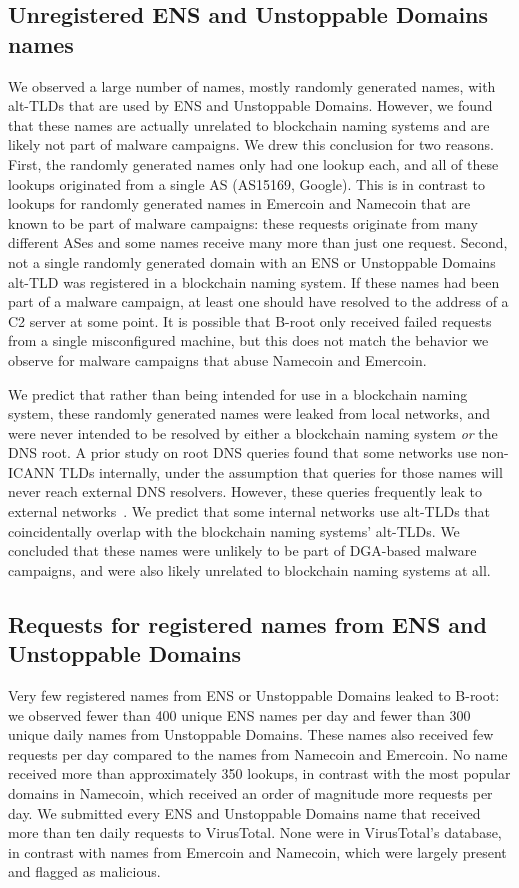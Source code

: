 \subsection{Unregistered ENS and Unstoppable Domains names}
 
We observed a large number of names, mostly randomly 
generated names, with alt-TLDs that are used 
by ENS and Unstoppable Domains. However, we found that these names are actually 
unrelated to blockchain naming systems and are likely not part of malware 
campaigns. We drew this conclusion for two reasons. First, the randomly 
generated names
only had one lookup each, and all of these lookups originated from a single AS 
(AS15169, Google). This is in contrast to lookups for 
randomly generated names in Emercoin and 
Namecoin that are known to be part of malware campaigns: 
these requests 
originate from many different ASes and some names receive 
many more than just one request. Second, not a single 
randomly generated domain with an ENS or Unstoppable 
Domains alt-TLD was registered in a blockchain naming system. If these names 
had been part of a malware campaign, at least one should have resolved to the 
address of a C2 server at some point. It is possible that B-root only received 
failed requests from a single misconfigured machine, but this does not match 
the behavior we observe for malware campaigns that abuse Namecoin and Emercoin.

We predict that rather than being intended for use in a blockchain naming 
system, these randomly generated names were leaked from local 
networks, and were never intended to 
be resolved by either a blockchain naming system \emph{or} the DNS root. A 
prior study on root DNS queries 
found that some networks use non-ICANN TLDs internally, under the assumption 
that queries for those names will never reach external DNS resolvers. However, 
these queries frequently leak to external networks~\cite{chen_wpad_2016}. We 
predict that some internal networks use alt-TLDs that coincidentally overlap 
with the blockchain naming systems' alt-TLDs. We concluded that these names 
were unlikely to be part of DGA-based malware campaigns, and were also likely 
unrelated to blockchain naming systems at all.

\subsection{Requests for registered names from ENS and 
Unstoppable Domains}

Very few registered names from ENS or Unstoppable Domains leaked to B-root: we 
observed 
fewer than 400 unique ENS names per day and fewer than 300 unique daily names 
from Unstoppable Domains. These names also received few requests per day 
compared to the names from Namecoin and Emercoin. No name received more than 
approximately 350 lookups, %
in contrast with the most popular domains in 
Namecoin, which received an order of magnitude more requests per day. 
We submitted every ENS and Unstoppable Domains name that received more than ten 
daily requests to VirusTotal. None were in VirusTotal's database, in contrast 
with names from Emercoin and Namecoin, which were largely present and flagged 
as malicious.

